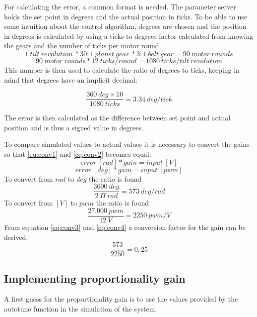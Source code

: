 For calculating the error, a common format is needed. The parameter server holds the set point in degrees and the actual position in ticks. To be able to use some intuition about the control algorithm, degrees are chosen and the position in degrees is calculated by using a ticks to degrees factor calculated from knowing the gears and the number of ticks per motor round.
\begin{equation}
1 \ tilt \ revolution \ * 30:1 \ planet \ gear \ * 3:1 \ belt \ gear = 90 \ motor \ rounds
\end{equation}
\begin{equation}
 90 \ motor \ rounds * 12 \ ticks/round = 1080 \ ticks/tilt \ revolution
\end{equation}
This number is then used to calculate the ratio of degrees to ticks, keeping in mind that degrees have an implicit decimal:

\begin{equation}
\frac{360 \ deg \times 10}{1080 \ ticks} = 3.34\ deg/tick 
\end{equation}

The error is then calculated as the difference between set point and actual position and is thus a signed value in degrees.

To compare simulated values to actual values it is necessary to convert the gains so that \ref{eq:conv1} and \ref{eq:conv2} becomes equal. 
\begin{equation}
error \ [rad] * gain = input \ [V]
\label{eq:conv1}
\end{equation}
\begin{equation}
error \ [deg] * gain = input \ [pwm]
\label{eq:conv2}
\end{equation}
To convert from $rad$ to $deg$ the ratio is found
\begin{equation}
\frac{3600 \ deg}{2 \ \Pi \ rad} = 573 \ deg/rad
\label{eq:conv3}
\end{equation}
To convert from $[V]$ to $pwm$ the ratio is found
\begin{equation}
\frac{27.000 \ pwm}{12 \ V} = 2250 \ pwm/V
\label{eq:conv4}
\end{equation}
From equation \ref{eq:conv3} and \ref{eq:conv4} a conversion factor for the gain can be derived.
\begin{equation}
\frac{573}{2250} = 0,25
\label{eq:conv}
\end{equation}

\subsection{Implementing proportionality gain}
A first guess for the proportionality gain is to use the values provided by the autotune function in the simulation of the system. 

